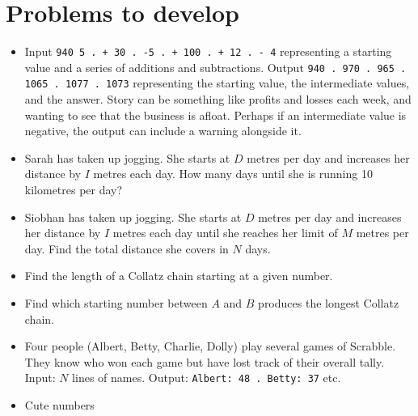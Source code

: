 \section*{Problems to develop}
\begin{itemize}
  \item Input \texttt{940 5 . + 30 . -5 . + 100 . + 12 . - 4} representing a starting
    value and a series of additions and subtractions. Output \texttt{940 . 970 . 965 .
    1065 . 1077 . 1073} representing the starting value, the intermediate values, and the
    answer. Story can be something like profits and losses each week, and wanting to see
    that the business is afloat. Perhaps if an intermediate value is negative, the output
    can include a warning alongside it.
  \item Sarah has taken up jogging. She starts at $D$ metres per day and increases her
    distance by $I$ metres each day. How many days until she is running 10 kilometres per
    day?
  \item Siobhan has taken up jogging. She starts at $D$ metres per day and increases her
    distance by $I$ metres each day until she reaches her limit of $M$ metres per day.
    Find the total distance she covers in $N$ days.
  \item Find the length of a Collatz chain starting at a given number.
  \item Find which starting number between $A$ and $B$ produces the longest Collatz chain.
  \item Four people (Albert, Betty, Charlie, Dolly) play several games of Scrabble. They
    know who won each game but have lost track of their overall tally. Input: $N$ lines of
    names. Output: \texttt{Albert: 48 . Betty: 37} etc.
  \item Cute numbers
\end{itemize}

